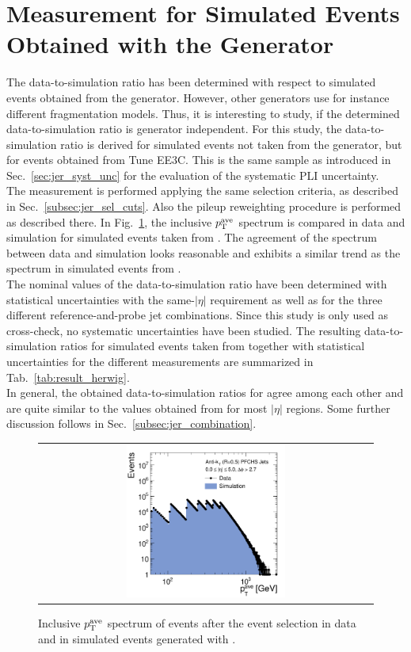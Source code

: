 \section{Measurement for Simulated Events Obtained with the \herwig Generator} 
\label{sec:jer_result_herwig}
The data-to-simulation ratio has been determined with respect to simulated events obtained from the \pythia generator. However, other generators use for instance different fragmentation models. Thus, it is interesting to study, if the determined data-to-simulation ratio is generator independent. For this study, the data-to-simulation ratio is derived for simulated events not taken from the \pythia generator, but for events obtained from \herwig Tune EE3C. This is the same sample as introduced in Sec.~\ref{sec:jer_syst_unc} for the evaluation of the systematic PLI uncertainty. \\
The measurement is performed applying the same selection criteria, as described in Sec.~\ref{subsec:jer_sel_cuts}. Also the pileup reweighting procedure is performed as described there. In Fig.~\ref{fig:control_plots_herwig}, the inclusive $p_{\text{T}}^\mathrm{ave}$ spectrum is compared in data and simulation for simulated events taken from \herwig. The agreement of the \ptave spectrum between data and simulation looks reasonable and exhibits a similar trend as the spectrum in simulated events from \pythia.\\
The nominal values of the data-to-simulation ratio have been determined with statistical uncertainties with the same-$|\eta|$ requirement as well as for the three different reference-and-probe jet combinations. Since this study is only used as cross-check, no systematic uncertainties have been studied. The resulting data-to-simulation ratios for simulated events taken from \herwig together with statistical uncertainties for the different measurements are summarized in Tab.~\ref{tab:result_herwig}. \\
In general, the obtained data-to-simulation ratios for \herwig agree among each other and are quite similar to the values obtained from \pythia for most $|\eta|$ regions. Some further discussion follows in Sec.~\ref{subsec:jer_combination}.
\begin{figure}[!p]
  \centering
  \begin{tabular}{c}
                \includegraphics[width=0.49\textwidth]{figures/HerwigPtAve__AfterAsymmHistos.pdf}
  \end{tabular}
  \caption{Inclusive $p_{\text{T}}^\mathrm{ave}$ spectrum of events after the event selection in data and in simulated events generated with \herwig.}
  \label{fig:control_plots_herwig}
\end{figure}
